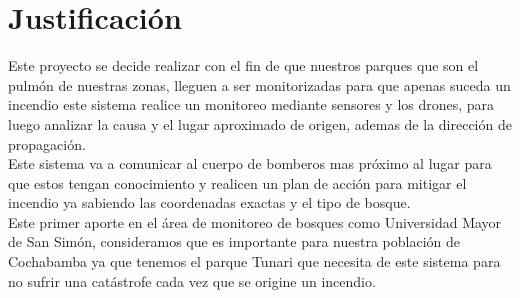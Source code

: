 \documentclass[letter,12pt]{article}
\begin{document}


\section{Justificaci\'on}
Este proyecto se decide realizar con el fin de que nuestros parques que son el pulmón de nuestras zonas, lleguen a ser monitorizadas para que apenas suceda un incendio este sistema realice un monitoreo mediante sensores y los drones, para luego analizar la causa y el lugar aproximado de origen, ademas de la dirección de propagación.\\

Este sistema va a comunicar al cuerpo de bomberos mas próximo al lugar para que estos tengan conocimiento y realicen un plan de acción para mitigar el incendio ya sabiendo las coordenadas exactas y el tipo de bosque.\\

Este primer aporte en el área de monitoreo de bosques como Universidad Mayor de San Simón, consideramos que es importante para nuestra población de Cochabamba ya que tenemos el parque Tunari que necesita de este sistema para no sufrir una catástrofe cada vez que se origine un incendio. 
\end{document}
